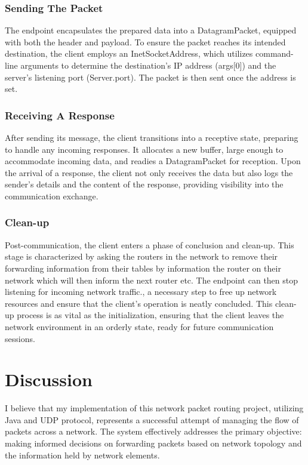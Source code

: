\documentclass{article}
\begin{document}
\subsubsection*{Sending The Packet}
The endpoint encapsulates the prepared data into a DatagramPacket, equipped with both the header and payload. To ensure the packet reaches its intended destination, the client employs an InetSocketAddress, which utilizes command-line arguments to determine the destination's IP address (args[0]) and the server's listening port (Server.port). The packet is then sent once the address is set.

\subsubsection*{Receiving A Response}
After sending its message, the client transitions into a receptive state, preparing to handle any incoming responses. It allocates a new buffer, large enough to accommodate incoming data, and readies a DatagramPacket for reception. Upon the arrival of a response, the client not only receives the data but also logs the sender's details and the content of the response, providing visibility into the communication exchange.

\subsubsection{Clean-up}
Post-communication, the client enters a phase of conclusion and clean-up. This stage is characterized by asking the routers in the network to remove their forwarding information from their tables by information the router on their network which will then inform the next router etc. The endpoint can then stop listening for incoming network traffic., a necessary step to free up network resources and ensure that the client's operation is neatly concluded. This clean-up process is as vital as the initialization, ensuring that the client leaves the network environment in an orderly state, ready for future communication sessions.

\section{Discussion}
\label{sec:Discussion}

I believe that my implementation of this network packet routing project, utilizing Java and UDP protocol, represents a successful attempt of managing the flow of packets across a network. The system effectively addresses the primary objective: making informed decisions on forwarding packets based on network topology and the information held by network elements.
\end{document}

